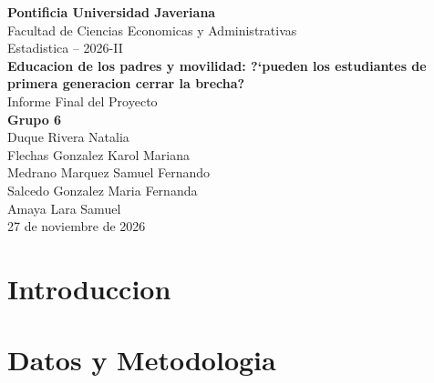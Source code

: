 \documentclass[11pt, a4paper]{article}
\begin{document}
\begin{center}
{\Large \textbf{Pontificia Universidad Javeriana}}\\[0.3cm]
Facultad de Ciencias Economicas y Administrativas\\[0.3cm]
Estadistica -- 2026-II\\[1cm]
{\LARGE \textbf{Educacion de los padres y movilidad: ?`pueden los estudiantes de primera generacion cerrar la brecha?}}\\[0.5cm]
{\large Informe Final del Proyecto}\\[1cm]
\textbf{Grupo 6}\\[0.3cm]
Duque Rivera Natalia\\
Flechas Gonzalez Karol Mariana\\
Medrano Marquez Samuel Fernando\\
Salcedo Gonzalez Maria Fernanda\\
Amaya Lara Samuel\\[1cm]
27 de noviembre de 2026
\end{center}

\newpage
\tableofcontents
\newpage

\section{Introduccion}

\section{Datos y Metodologia}
\end{document}
